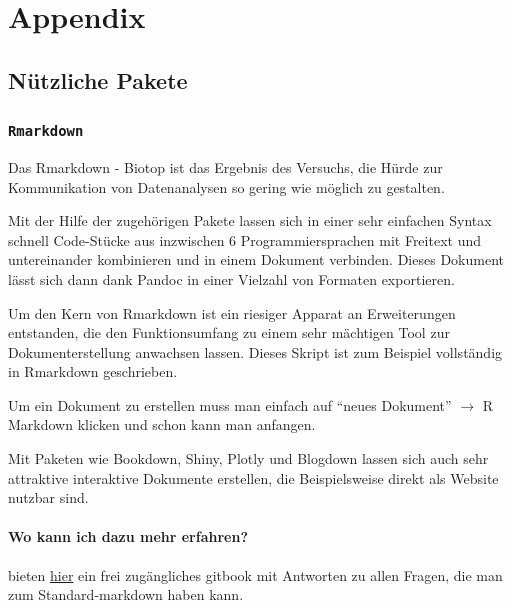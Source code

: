 \documentclass[
]{book}
\begin{document}
\hypertarget{appendix}{%
\chapter{Appendix}\label{appendix}}

\hypertarget{nuxfctzliche-pakete}{%
\section{Nützliche Pakete}\label{nuxfctzliche-pakete}}

\hypertarget{rmarkdown}{%
\subsection{\texorpdfstring{\texttt{Rmarkdown}}{Rmarkdown}}\label{rmarkdown}}

Das Rmarkdown - Biotop ist das Ergebnis des Versuchs, die Hürde zur Kommunikation von Datenanalysen so gering wie möglich zu gestalten.

Mit der Hilfe der zugehörigen Pakete lassen sich in einer sehr einfachen Syntax schnell Code-Stücke aus inzwischen 6 Programmiersprachen mit Freitext und untereinander kombinieren und in einem Dokument verbinden. Dieses Dokument lässt sich dann dank Pandoc in einer Vielzahl von Formaten exportieren.

Um den Kern von Rmarkdown ist ein riesiger Apparat an Erweiterungen entstanden, die den Funktionsumfang zu einem sehr mächtigen Tool zur Dokumenterstellung anwachsen lassen. Dieses Skript ist zum Beispiel vollständig in Rmarkdown geschrieben.

Um ein Dokument zu erstellen muss man einfach auf ``neues Dokument'' \(\rightarrow\) R Markdown klicken und schon kann man anfangen.

Mit Paketen wie Bookdown, Shiny, Plotly und Blogdown lassen sich auch sehr attraktive interaktive Dokumente erstellen, die Beispielsweise direkt als Website nutzbar sind.

\hypertarget{wo-kann-ich-dazu-mehr-erfahren}{%
\subsubsection{Wo kann ich dazu mehr erfahren?}\label{wo-kann-ich-dazu-mehr-erfahren}}

\citet{grolemundMarkdownDefinitiveGuide} bieten \href{https://bookdown.org/yihui/rmarkdown/}{hier} ein frei zugängliches gitbook mit Antworten zu allen Fragen, die man zum Standard-markdown haben kann.
\end{document}
